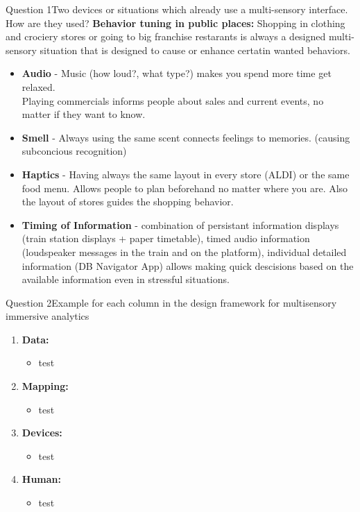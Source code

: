 \documentclass[t,aspectratio=169,divpsnames]{beamer}
\begin{document}
\begin{frame}{Question 1}{Two devices or situations which already use a multi-sensory interface. How are they used? }
\scriptsize
\textbf{Behavior tuning in public places:} Shopping in clothing and crociery stores or going to big franchise restarants is always a designed multi-sensory situation that is designed to cause or enhance certatin wanted behaviors.
    \begin{itemize}\scriptsize
    \item \textbf{Audio} - Music (how loud?, what type?) makes you spend more time get relaxed. \\%
    Playing commercials informs people about sales and current events, no matter if they want to know.
    \item \textbf{Smell} - Always using the same scent connects feelings to memories. (causing subconcious recognition)
    \item \textbf{Haptics} - Having always the same layout in every store (ALDI) or the same food menu. Allows people to plan beforehand no matter where you are. Also the layout of stores guides the shopping behavior.
    \item \textbf{Timing of Information} - combination of persistant information displays (train station displays + paper timetable), timed audio information (loudspeaker messages in the train and on the platform), individual detailed information (DB Navigator App) allows making quick descisions based on the available information even in stressful situations. 
\end{itemize}
\end{frame}



\begin{frame}{Question 2}{Example for each column in the design framework for multisensory immersive analytics}
\scriptsize
\begin{enumerate}
    \item \textbf{Data:}
    \begin{itemize}
        \item test
    \end{itemize}
    \item \textbf{Mapping:}
    \begin{itemize}
        \item test
    \end{itemize}
    \item \textbf{Devices:}
    \begin{itemize}
        \item test
    \end{itemize}
    \item \textbf{Human:}
    \begin{itemize}
        \item test
    \end{itemize}
\end{enumerate}


\end{frame}
\end{document}
